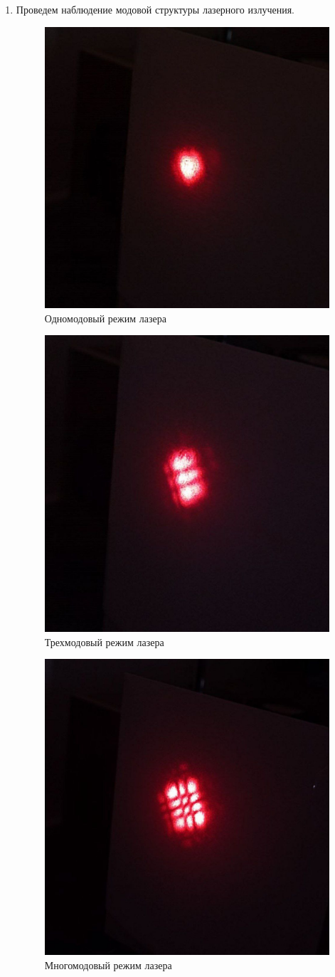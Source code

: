 \documentclass[a4paper,12pt]{article}
\begin{document}
\begin{enumerate}
    \item Проведем наблюдение модовой структуры лазерного излучения.

    \begin{figure}[h]
    \centering
    \includegraphics[width=0.4\linewidth]{photo2.jpg}
    \caption{Одномодовый режим лазера}
    \label{photo2}
    \end{figure}

    \begin{figure}[h]
    \centering
    \includegraphics[width=0.4\linewidth]{photo3.jpg}
    \caption{Трехмодовый режим лазера}
    \label{photo3}
    \end{figure}

    \begin{figure}[h]
    \centering
    \includegraphics[width=0.4\linewidth]{photo4.jpg}
    \caption{Многомодовый режим лазера}
    \label{photo4}
    \end{figure}
\end{enumerate}
\end{document}
